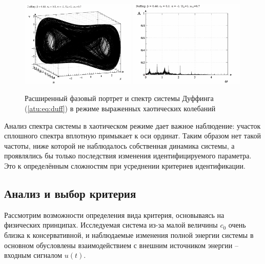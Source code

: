 \begin{figure}[ht!]
\begin{center}
  \includegraphics[width=0.49\textwidth]{p/cha/duff/duff_p_1x00_0x70_0x48.png}
  \hfill
  \includegraphics[width=0.49\textwidth]{p/cha/duff/duff_f_1x00_0x70_0x48.png}
\end{center}
  \caption{Расширенный фазовый портрет и спектр системы Дуффинга (\ref{atu:eq:duff}) в режиме выраженных хаотических колебаний}
\label{atu:f:duff_phase_f_chaos2}
\end{figure}

Анализ спектра системы в хаотическом режиме дает
важное наблюдение: участок сплошного спектра
вплотную примыкает к оси ординат. Таким образом
нет такой частоты, ниже которой не наблюдалось собственная
динамика системы, а проявлялись бы только последствия изменения
идентифицируемого параметра. Это к определённым сложностям
при усреднении критериев идентификации.





\subsection{Анализ и выбор критерия}  %

Рассмотрим возможности определения вида критерия,
основываясь на физических принципах.
Исследуемая система из-за
малой величины \(c_0\) очень близка к консервативной,
и наблюдаемые изменения полной энергии системы
в основном обусловлены взаимодействием с внешним
источником энергии -- входным сигналом \(u(t)\).

